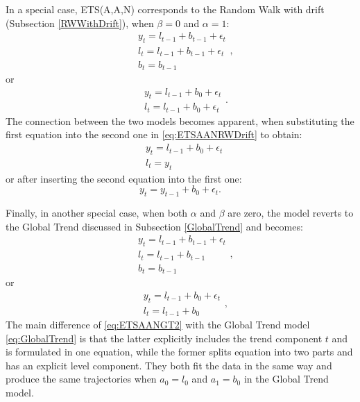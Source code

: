 \documentclass[]{book}
\theoremstyle{definition}
\theoremstyle{definition}
\theoremstyle{definition}
\theoremstyle{definition}
\theoremstyle{remark}
\begin{document}
In a special case, ETS(A,A,N) corresponds to the Random Walk with drift (Subsection \ref{RWWithDrift}), when \(\beta=0\) and \(\alpha=1\):
\begin{equation*}
  \begin{aligned}
    & y_{t} = l_{t-1} + b_{t-1} + \epsilon_t \\
    & l_t = l_{t-1} + b_{t-1} + \epsilon_t \\
    & b_t = b_{t-1}
  \end{aligned} ,
\end{equation*}
or
\begin{equation}
  \begin{aligned}
    & y_{t} = l_{t-1} + b_{0} + \epsilon_t \\
    & l_t = l_{t-1} + b_{0} + \epsilon_t
  \end{aligned} .
  \label{eq:ETSAANRWDrift}
\end{equation}
The connection between the two models becomes apparent, when substituting the first equation into the second one in \eqref{eq:ETSAANRWDrift} to obtain:
\begin{equation}
  \begin{aligned}
    & y_{t} = l_{t-1} + b_{0} + \epsilon_t \\
    & l_t = y_{t}
  \end{aligned} 
\end{equation}
or after inserting the second equation into the first one:
\begin{equation}
  y_{t} = y_{t-1} + b_{0} + \epsilon_t .
\end{equation}

Finally, in another special case, when both \(\alpha\) and \(\beta\) are zero, the model reverts to the Global Trend discussed in Subsection \ref{GlobalTrend} and becomes:
\begin{equation*}
  \begin{aligned}
    & y_{t} = l_{t-1} + b_{t-1} + \epsilon_t \\
    & l_t = l_{t-1} + b_{t-1} \\
    & b_t = b_{t-1}
  \end{aligned} ,
\end{equation*}
or
\begin{equation}
  \begin{aligned}
    & y_{t} = l_{t-1} + b_{0} + \epsilon_t \\
    & l_t = l_{t-1} + b_{0}
  \end{aligned} ,
  \label{eq:ETSAANGT2}
\end{equation}
The main difference of \eqref{eq:ETSAANGT2} with the Global Trend model \eqref{eq:GlobalTrend} is that the latter explicitly includes the trend component \(t\) and is formulated in one equation, while the former splits equation into two parts and has an explicit level component. They both fit the data in the same way and produce the same trajectories when \(a_0 = l_0\) and \(a_1 = b_0\) in the Global Trend model.
\end{document}
